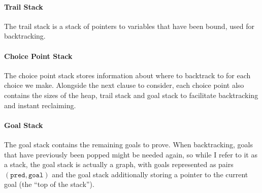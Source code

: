 \paragraph{Trail Stack} The trail stack is a stack of pointers to variables that have been bound, used for backtracking.

\paragraph{Choice Point Stack} The choice point stack stores information about where to backtrack to for each choice we make. Alongside the next clause to consider, each choice point also contains the sizes of the heap, trail stack and goal stack to facilitate backtracking and instant reclaiming.

\paragraph{Goal Stack} The goal stack contains the remaining goals to prove. When backtracking, goals that have previously been popped might be needed again, so while I refer to it as a stack, the goal stack is actually a graph, with goals represented as pairs $(\texttt{pred}, \texttt{goal})$ and the goal stack additionally storing a pointer to the current goal (the ``top of the stack'').

